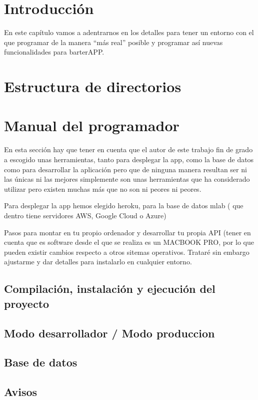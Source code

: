 
\section{Introducción}\label{introduccion-programador}
En este capítulo vamos a adentrarnos en los detalles para tener un entorno con el que programar de la manera “más real” posible y programar así nuevas funcionalidades para barterAPP.

\section{Estructura de directorios}\label{directorios}

\section{Manual del programador}
En esta sección hay que tener en cuenta que el autor de este trabajo fin de grado a escogido unas herramientas, tanto para desplegar la app, como la base de datos como para desarrollar la aplicación pero que de ninguna manera resultan ser ni las únicas ni las mejores simplemente son unas herramientas que ha considerado utilizar pero existen muchas más que no son ni peores ni peores. 

Para desplegar la app hemos elegido heroku, para la base de datos mlab ( que dentro tiene servidores AWS, Google Cloud o Azure)

Pasos para montar en tu propio ordenador y desarrollar tu propia API (tener en cuenta que es software desde el que se realiza es un MACBOOK PRO, por lo que pueden existir cambios respecto a otros sitemas operativos. Trataré sin embargo ajustarme y dar detalles para instalarlo en cualquier entorno.

\subsection{Compilación, instalación y ejecución del proyecto}
\subsection{Modo desarrollador / Modo produccion}
\subsection{Base de datos}
\subsection{Avisos}


